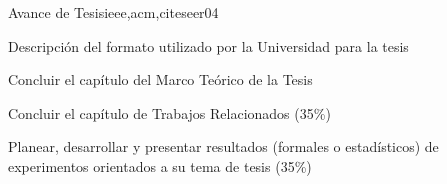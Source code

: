 \begin{syllabus}
\begin{unit}{Avance de Tesis}{ieee,acm,citeseer}{0}{4}
\begin{unitgoals}
      \item Descripción del formato utilizado por la Universidad para la tesis
      \item Concluir el capítulo del Marco Teórico de la Tesis
      \item Concluir el capítulo de Trabajos Relacionados (35\%)
      \item Planear, desarrollar y presentar resultados (formales o estadísticos) de experimentos orientados a su tema de tesis (35\%)
   \end{unitgoals}
\end{unit}



\begin{coursebibliography}

\end{coursebibliography}
\end{syllabus}
